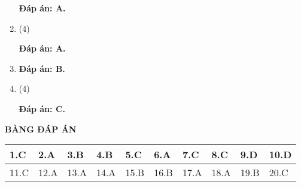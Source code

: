 \begin{enumerate}[label=\bfseries Câu \arabic*:]
{\begin{mcq}
		\end{mcq}
	}

	\loigiai
	{

		\textbf{Đáp án: A.}
	}

\item {}
	
	\cauhoi
	{
		\begin{mcq}(4)

		\end{mcq}
	
	}

	\loigiai
	{
		
		\textbf{Đáp án: A.}
	}

\item {}
	
	\cauhoi
	{
		\begin{mcq}

		\end{mcq}
	}

	\loigiai
	{
		
		\textbf{Đáp án: B.}
	}

\item {}
	
	\cauhoi
	{
		\begin{mcq}(4)

		\end{mcq}
	}

	\loigiai
	{
		
		\textbf{Đáp án: C.}
	}
\end{enumerate}

\whiteBGstarEnd

\loigiai
{
	\begin{center}
	\textbf{BẢNG ĐÁP ÁN}
\end{center}
\begin{center}
	\begin{tabular}{|m{2.8em}|m{2.8em}|m{2.8em}|m{2.8em}|m{2.8em}|m{2.8em}|m{2.8em}|m{2.8em}|m{2.8em}|m{2.8em}|}
		\hline
		1.C  & 2.A  & 3.B  & 4.B  & 5.C  & 6.A  & 7.C  & 8.C  & 9.D  & 10.D  \\
		\hline
		11.C  & 12.A  & 13.A  & 14.A  & 15.B  & 16.B  & 17.A  & 18.A  & 19.B  & 20.C  \\
		\hline
		
	\end{tabular}
\end{center}
}